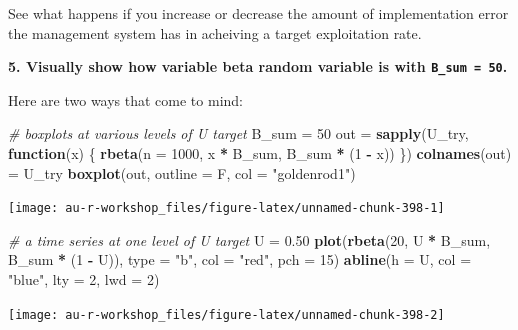 \documentclass[]{book}
\newenvironment{Shaded}{\begin{snugshade}}{\end{snugshade}}
\newcommand{\CommentTok}[1]{\textcolor[rgb]{0.56,0.35,0.01}{\textit{#1}}}
\newcommand{\ControlFlowTok}[1]{\textcolor[rgb]{0.13,0.29,0.53}{\textbf{#1}}}
\newcommand{\DataTypeTok}[1]{\textcolor[rgb]{0.13,0.29,0.53}{#1}}
\newcommand{\DecValTok}[1]{\textcolor[rgb]{0.00,0.00,0.81}{#1}}
\newcommand{\FloatTok}[1]{\textcolor[rgb]{0.00,0.00,0.81}{#1}}
\newcommand{\KeywordTok}[1]{\textcolor[rgb]{0.13,0.29,0.53}{\textbf{#1}}}
\newcommand{\NormalTok}[1]{#1}
\newcommand{\OperatorTok}[1]{\textcolor[rgb]{0.81,0.36,0.00}{\textbf{#1}}}
\newcommand{\StringTok}[1]{\textcolor[rgb]{0.31,0.60,0.02}{#1}}
\begin{document}
See what happens if you increase or decrease the amount of implementation error the management system has in acheiving a target exploitation rate.

\textbf{5. Visually show how variable beta random variable is with \texttt{B\_sum\ =\ 50}.}

Here are two ways that come to mind:

\begin{Shaded}
\begin{Highlighting}[]
\CommentTok{# boxplots at various levels of U target}
\NormalTok{B_sum =}\StringTok{ }\DecValTok{50}
\NormalTok{out =}\StringTok{ }\KeywordTok{sapply}\NormalTok{(U_try, }\ControlFlowTok{function}\NormalTok{(x) \{}
  \KeywordTok{rbeta}\NormalTok{(}\DataTypeTok{n =} \DecValTok{1000}\NormalTok{, x }\OperatorTok{*}\StringTok{ }\NormalTok{B_sum, B_sum }\OperatorTok{*}\StringTok{ }\NormalTok{(}\DecValTok{1} \OperatorTok{-}\StringTok{ }\NormalTok{x))}
\NormalTok{\})}
\KeywordTok{colnames}\NormalTok{(out) =}\StringTok{ }\NormalTok{U_try}
\KeywordTok{boxplot}\NormalTok{(out, }\DataTypeTok{outline =}\NormalTok{ F, }\DataTypeTok{col =} \StringTok{"goldenrod1"}\NormalTok{)}
\end{Highlighting}
\end{Shaded}

\begin{center}\texttt{[image: au-r-workshop\_files/figure-latex/unnamed-chunk-398-1]} \end{center}

\begin{Shaded}
\begin{Highlighting}[]
\CommentTok{# a time series at one level of U target}
\NormalTok{U =}\StringTok{ }\FloatTok{0.50}
\KeywordTok{plot}\NormalTok{(}\KeywordTok{rbeta}\NormalTok{(}\DecValTok{20}\NormalTok{, U }\OperatorTok{*}\StringTok{ }\NormalTok{B_sum, B_sum }\OperatorTok{*}\StringTok{ }\NormalTok{(}\DecValTok{1} \OperatorTok{-}\StringTok{ }\NormalTok{U)), }\DataTypeTok{type =} \StringTok{"b"}\NormalTok{, }\DataTypeTok{col =} \StringTok{"red"}\NormalTok{, }\DataTypeTok{pch =} \DecValTok{15}\NormalTok{)}
\KeywordTok{abline}\NormalTok{(}\DataTypeTok{h =}\NormalTok{ U, }\DataTypeTok{col =} \StringTok{"blue"}\NormalTok{, }\DataTypeTok{lty =} \DecValTok{2}\NormalTok{, }\DataTypeTok{lwd =} \DecValTok{2}\NormalTok{)}
\end{Highlighting}
\end{Shaded}

\begin{center}\texttt{[image: au-r-workshop\_files/figure-latex/unnamed-chunk-398-2]} \end{center}
\end{document}
